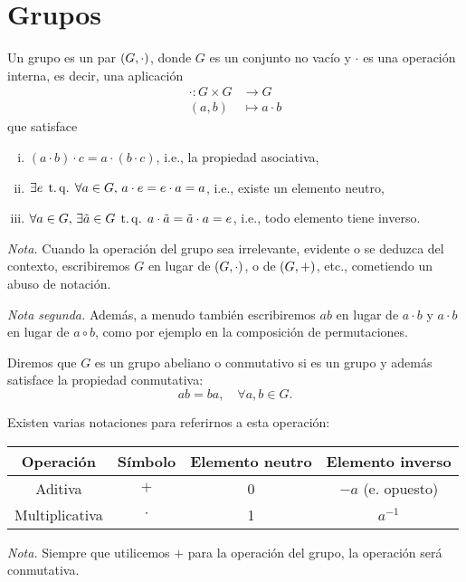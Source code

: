 \chapter{Grupos}

\begin{defi}[grupo]
    Un grupo es un par $\left( G, \cdot \right)$, donde $G$ es un conjunto no vacío y $\cdot$ es una operación interna, es decir, una aplicación
    \[
        \begin{aligned}
            \cdot \colon G \times G &\to G \\
            (a, b) &\mapsto a \cdot b
        \end{aligned}
    \]
    que satisface
    \begin{enumerate}[i)]
        \item $(a\cdot b)\cdot c = a\cdot (b\cdot c)$, i.e., la propiedad asociativa,
        \item $\exists e \operatorname{\;t.q.\;} \forall a \in G, \, a\cdot e = e\cdot a = a$, i.e., existe un elemento neutro,
        \item $\forall a \in G, \, \exists \tilde{a} \in G \operatorname{\;t.q.\;} a \cdot \tilde{a} = \tilde{a}\cdot a = e$, i.e., todo elemento tiene inverso.
    \end{enumerate}
    \emph{Nota.} Cuando la operación del grupo sea irrelevante, evidente o se deduzca del contexto, escribiremos $G$ en lugar de $\left( G, \cdot\right)$, o de $\left( G, +\right)$, etc., cometiendo un abuso de notación.
    
    \vspace{1.15ex}
    
    \noindent \emph{Nota segunda.} Además, a menudo también escribiremos $ab$ en lugar de $a\cdot b$ y $a\cdot b$ en lugar de $a\circ b$, como por ejemplo en la composición de permutaciones.
\end{defi}

\begin{defi}
    Diremos que $G$ es un grupo abeliano o conmutativo si es un grupo y además satisface la propiedad conmutativa:
    \[
        ab = ba, \quad \forall a, b \in G.
    \]
\end{defi}

\begin{obs}
    Existen varias notaciones para referirnos a esta operación:
    \begin{center}
        \begin{tabular}{|c|c|c|c|} \hline
            Operación & S\'imbolo & Elemento neutro & Elemento inverso \\ \hline \hline
            Aditiva & $+$ & 0 & $-a$ (e. opuesto) \\ \hline
            Multiplicativa & $\cdot$ & 1 & $a^{-1}$ \\ \hline
        \end{tabular}
    \end{center}
    \emph{Nota.} Siempre que utilicemos $+$ para la operación del grupo, la operación será conmutativa.
\end{obs}

